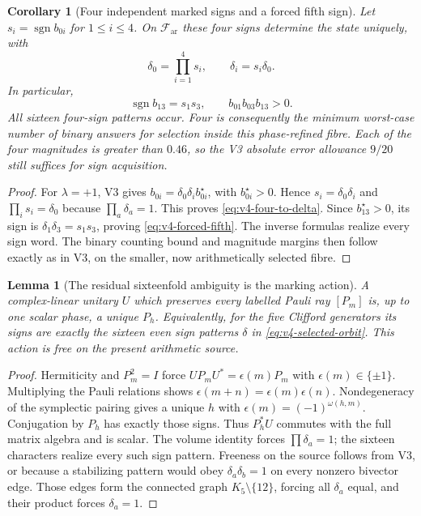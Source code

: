 \documentclass[11pt]{article}
\newtheorem{lemma}[lemma]{Lemma}
\newtheorem{corollary}[corollary]{Corollary}
\theoremstyle{definition}
\theoremstyle{remark}
\begin{document}
\begin{corollary}[Four independent marked signs and a forced fifth sign]
\label{cor:v4-four-signs}
Let $s_i=\operatorname{sgn}b_{0i}$ for $1\le i\le4$. On
$\mathcal F_{\mathrm{ar}}$ these four signs determine the state uniquely,
with
\begin{equation}
 \delta_0=\prod_{i=1}^4s_i,\qquad \delta_i=s_i\delta_0.
 \label{eq:v4-four-to-delta}
\end{equation}
In particular,
\begin{equation}
 \boxed{\operatorname{sgn}b_{13}=s_1s_3,
 \qquad b_{01}b_{03}b_{13}>0.}
 \label{eq:v4-forced-fifth}
\end{equation}
All sixteen four-sign patterns occur. Four is consequently the minimum
worst-case number of binary answers for selection inside this phase-refined
fibre. Each of the four magnitudes is greater than $0.46$, so the V3
absolute error allowance $9/20$ still suffices for sign acquisition.
\end{corollary}
\begin{proof}
For $\lambda=+1$, V3 gives $b_{0i}=\delta_0\delta_i b_{0i}^\star$, with
$b_{0i}^\star>0$. Hence $s_i=\delta_0\delta_i$ and
$\prod_i s_i=\delta_0$ because $\prod_a\delta_a=1$.
This proves \eqref{eq:v4-four-to-delta}. Since $b_{13}^\star>0$,
its sign is $\delta_1\delta_3=s_1s_3$, proving
\eqref{eq:v4-forced-fifth}. The inverse formulas realize every sign word.
The binary counting bound and magnitude margins then follow exactly as
in V3, on the smaller, now arithmetically selected fibre.
\end{proof}

\begin{lemma}[The residual sixteenfold ambiguity is the marking action]
\label{lem:v4-marking}
A complex-linear unitary $U$ which preserves every labelled Pauli ray
$[P_m]$ is, up to one scalar phase, a unique $P_h$. Equivalently, for the
five Clifford generators its signs are exactly the sixteen even sign
patterns $\delta$ in \eqref{eq:v4-selected-orbit}. This action is free on
the present arithmetic source.
\end{lemma}
\begin{proof}
Hermiticity and $P_m^2=I$ force
$UP_mU^*=\epsilon(m)P_m$ with $\epsilon(m)\in\{\pm1\}$.
Multiplying the Pauli relations shows
$\epsilon(m+n)=\epsilon(m)\epsilon(n)$. Nondegeneracy of the symplectic
pairing gives a unique $h$ with $\epsilon(m)=(-1)^{\omega(h,m)}$.
Conjugation by $P_h$ has exactly those signs. Thus $P_h^*U$ commutes with
the full matrix algebra and is scalar. The volume identity forces
$\prod\delta_a=1$; the sixteen characters realize every such sign pattern.
Freeness on the source follows from V3, or because a stabilizing pattern
would obey $\delta_a\delta_b=1$ on every nonzero bivector edge. Those
edges form the connected graph $K_5\setminus\{12\}$, forcing all
$\delta_a$ equal, and their product forces $\delta_a=1$.
\end{proof}
\end{document}
